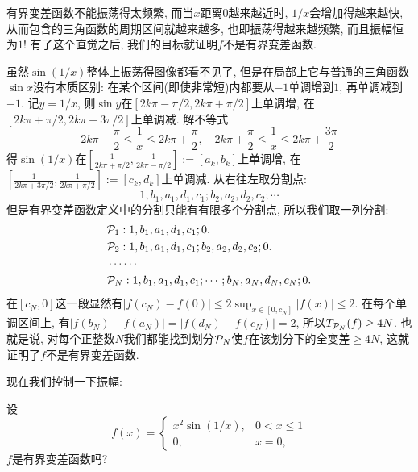 \begin{solution}
    有界变差函数不能振荡得太频繁, 而当$x$距离$0$越来越近时, $1/x$会增加得越来越快, 从而包含的三角函数的周期区间就越来越多, 也即振荡得越来越频繁, 而且振幅恒为$1$! 有了这个直觉之后, 我们的目标就证明$f$不是有界变差函数. \\
    \begin{center}
    \end{center}
    虽然$\sin(1/x)$整体上振荡得图像都看不见了, 但是在局部上它与普通的三角函数$\sin x$没有本质区别: 在某个区间(即使非常短)内都要从$-1$单调增到$1$, 再单调减到$-1$. 
    记$y=1/x$, 则$\sin y$在$[2k\pi - \pi/2, 2k\pi + \pi/2]$上单调增, 在$[2k\pi + \pi/2, 2k\pi + 3\pi/2]$上单调减. 解不等式
    $$2k\pi - \frac{\pi}{2} \leq \frac{1}{x} \leq 2k\pi + \frac{\pi}{2}, \quad
      2k\pi + \frac{\pi}{2} \leq \frac{1}{x} \leq 2k\pi + \frac{3\pi}{2} $$
    得$\sin(1/x)$在$\displaystyle{\left[\frac{1}{2k\pi+\pi/2}, \frac{1}{2k\pi-\pi/2} \right] := [a_k, b_k]}$上单调增, 
    在$\displaystyle{\left[\frac{1}{2k\pi+3\pi/2}, \frac{1}{2k\pi+\pi/2} \right]} := [c_k, d_k]$上单调减.
    从右往左取分割点:
    $$1, b_1, a_1, d_1, c_1; b_2, a_2, d_2, c_2; \cdots $$
    但是有界变差函数定义中的分割只能有有限多个分割点, 所以我们取一列分割:
    \begin{align*}
        &\mathcal{P}_1: 1, b_1, a_1, d_1, c_1; 0. \\
        &\mathcal{P}_2: 1, b_1, a_1, d_1, c_1; b_2, a_2, d_2, c_2; 0. \\
        &\cdots \cdots \\
        &\mathcal{P}_N: 1, b_1, a_1, d_1, c_1; \cdots; b_N, a_N, d_N, c_N; 0.
    \end{align*}
    在$[c_N, 0]$这一段显然有$|f(c_N)-f(0)| \leq 2\sup_{x\in [0,c_N]}|f(x)| \leq 2$. 在每个单调区间上, 有$|f(b_N)-f(a_N)|=|f(d_N)-f(c_N)|=2$, 所以$T_{\mathcal{P}_N}(f) \geq 4N$. 也就是说, 对每个正整数$N$我们都能找到划分$\mathcal{P}_N$使$f$在该划分下的全变差$\geq 4N$, 这就证明了$f$不是有界变差函数. 
\end{solution}                   
现在我们控制一下振幅:
\begin{example}
    设
    $$f(x)=\begin{cases}
        x^2 \sin (1/x), & 0 < x \leq 1 \\
        0,          & x = 0,
    \end{cases}$$
    $f$是有界变差函数吗?
\end{example}



